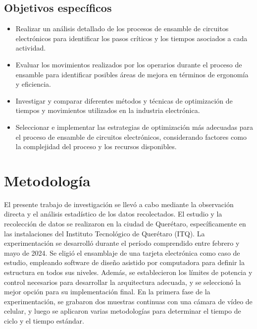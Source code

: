     \subsection{Objetivos específicos }


% 
%
\begin{itemize}
        \item Realizar un análisis detallado de los procesos de ensamble de circuitos electrónicos para identificar los pasos críticos y los tiempos asociados a cada actividad.
        \item Evaluar los movimientos realizados por los operarios durante el proceso de ensamble para identificar posibles áreas de mejora en términos de ergonomía y eficiencia.
        \item Investigar y comparar diferentes métodos y técnicas de optimización de tiempos y movimientos utilizados en la industria electrónica.
        \item Seleccionar e implementar las estrategias de optimización más adecuadas para el proceso de ensamble de circuitos electrónicos, considerando factores como la complejidad del proceso y los recursos disponibles.
    \end{itemize} 
    \section{Metodología}

El presente trabajo de investigación se llevó a cabo mediante la observación directa y el análisis estadístico de los datos recolectados.
El estudio y la recolección de datos se realizaron en la ciudad de Querétaro, específicamente en las instalaciones del Instituto Tecnológico de Querétaro (ITQ).
La experimentación se desarrolló durante el período comprendido entre febrero y mayo de 2024.
Se eligió el ensamblaje de una tarjeta electrónica como caso de estudio, empleando software de diseño asistido por computadora para definir la estructura en todos sus niveles. Además, se establecieron los límites de potencia y control necesarios para desarrollar la arquitectura adecuada, y se seleccionó la mejor opción para su implementación final. 
En la primera fase de la experimentación, se grabaron dos muestras continuas con una cámara de vídeo de celular, y luego se aplicaron varias metodologías para determinar el tiempo de ciclo y el tiempo estándar.
%
%

